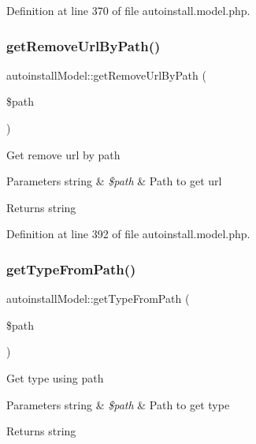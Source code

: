 Definition at line 370 of file autoinstall.\+model.\+php.

\mbox{\label{classautoinstallModel_a40c61ad733cb70958d2c550f06abc15d}} 
\subsubsection{\texorpdfstring{get\+Remove\+Url\+By\+Path()}{getRemoveUrlByPath()}}
{\footnotesize\ttfamily autoinstall\+Model\+::get\+Remove\+Url\+By\+Path (\begin{DoxyParamCaption}\item[{}]{\$path }\end{DoxyParamCaption})}

Get remove url by path


\begin{DoxyParams}[1]{Parameters}
string & {\em \$path} & Path to get url \\
\hline
\end{DoxyParams}
\begin{DoxyReturn}{Returns}
string 
\end{DoxyReturn}


Definition at line 392 of file autoinstall.\+model.\+php.

\mbox{\label{classautoinstallModel_a29f5fd06b39d6df431d699efcb0aba47}} 
\subsubsection{\texorpdfstring{get\+Type\+From\+Path()}{getTypeFromPath()}}
{\footnotesize\ttfamily autoinstall\+Model\+::get\+Type\+From\+Path (\begin{DoxyParamCaption}\item[{}]{\$path }\end{DoxyParamCaption})}

Get type using path


\begin{DoxyParams}[1]{Parameters}
string & {\em \$path} & Path to get type \\
\hline
\end{DoxyParams}
\begin{DoxyReturn}{Returns}
string 
\end{DoxyReturn}


